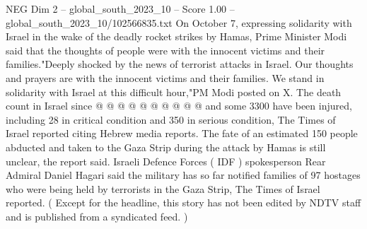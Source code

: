 \begin{textsample}{NEG Dim 2 – global\_south\_2023\_10 – Score 1.00 – global\_south\_2023\_10/102566835.txt}
On October 7, expressing solidarity with Israel in the wake of the deadly rocket strikes by Hamas, Prime Minister Modi said that the thoughts of people were with the innocent victims and their families."Deeply shocked by the news of terrorist attacks in Israel.
Our thoughts and prayers are with the innocent victims and their families.
We stand in solidarity with Israel at this difficult hour,"PM Modi posted on X.
The death count in Israel since @ @ @ @ @ @ @ @ @ @ and some 3300 have been injured, including 28 in critical condition and 350 in serious condition, The Times of Israel reported citing Hebrew media reports.
The fate of an estimated 150 people abducted and taken to the Gaza Strip during the attack by Hamas is still unclear, the report said.
Israeli Defence Forces ( IDF ) spokesperson Rear Admiral Daniel Hagari said the military has so far notified families of 97 hostages who were being held by terrorists in the Gaza Strip, The Times of Israel reported. ( Except for the headline, this story has not been edited by NDTV staff and is published from a syndicated feed. )

\end{textsample}
